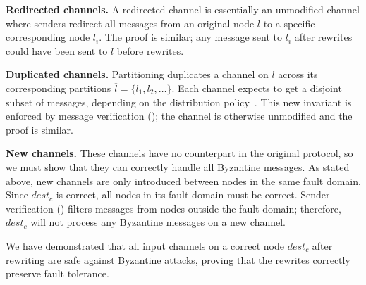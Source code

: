 \textbf{Redirected channels.}
A redirected channel is essentially an unmodified channel where senders redirect all messages from an original node $l$ to a specific corresponding node $l_i$.
The proof is similar; any message sent to $l_i$ after rewrites could have been sent to $l$ before rewrites. 

\textbf{Duplicated channels.}
Partitioning duplicates a channel on $l$ across its corresponding partitions $\overline{l} = \{l_1, l_2, \ldots\}$.
Each channel expects to get a disjoint subset of messages, depending on the distribution policy~\cite{autocomp}.
This new invariant is enforced by message verification (); the channel is otherwise unmodified and the proof is similar.

\textbf{New channels.}
These channels have no counterpart in the original protocol, so we must show that they can correctly handle all Byzantine messages.
As stated above, new channels are only introduced between nodes in the same fault domain.
Since $dest_c$ is correct, all nodes in its fault domain must be correct.
Sender verification () filters messages from nodes outside the fault domain; therefore, $dest_c$ will not process any Byzantine messages on a new channel.

We have demonstrated that all input channels on a correct node $dest_c$ after rewriting are safe against Byzantine attacks, proving that the rewrites correctly preserve fault tolerance.




